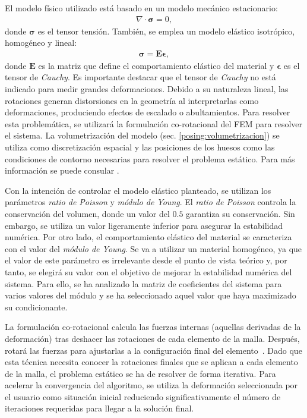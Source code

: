 
El modelo físico utilizado está basado en un modelo mecánico estacionario:
\begin{eqnarray}
\nabla \cdot \mathbf{\sigma} = 0,
\end{eqnarray}
donde $\mathbf{\sigma}$ es el tensor tensión. También, se emplea un modelo elástico isotrópico, homogéneo y lineal:  
\begin{eqnarray}
\mathbf{\sigma} = \mathbf{E}\mathbf{\epsilon}, 
\end{eqnarray}
donde $\mathbf{E}$ es la matriz que define el comportamiento elástico del material y $\mathbf{\epsilon}$ es el tensor de \emph{Cauchy}. Es importante destacar que el tensor de \emph{Cauchy} no está indicado para medir grandes deformaciones.  Debido a su naturaleza lineal, las rotaciones generan distorsiones en la geometría al interpretarlas como deformaciones, produciendo efectos de escalado o abultamientos. Para resolver esta problemática, se utilizará la formulación co-rotacional del \ac{FEM} para resolver el sistema. La volumetrización del modelo (sec. \ref{posing:volumetrizacion}) se utiliza como discretización espacial y las posiciones de los huesos como las condiciones de contorno necesarias para resolver el problema estático. Para más información se puede consular \cite{Muller2004}.

Con la intención de controlar el modelo elástico planteado, se utilizan los parámetros \emph{ratio de Poisson} y \emph {módulo de Young}. El \emph{ratio de Poisson} controla la conservación del volumen, donde un valor del $0.5$ garantiza su conservación. Sin embargo,  se utiliza un valor ligeramente inferior para asegurar la estabilidad numérica. 
Por otro lado, el comportamiento elástico del material se caracteriza con el valor del \emph {módulo de Young}. Se va a utilizar un material homogéneo, ya que el valor de este parámetro es irrelevante desde el punto de vista teórico y, por tanto, se elegirá su valor con el objetivo de mejorar la estabilidad numérica del sistema. 
Para ello, se ha analizado la matriz de coeficientes del sistema para varios valores del módulo y se ha seleccionado aquel valor que haya maximizado su condicionante.

La formulación co-rotacional calcula las fuerzas internas (aquellas derivadas de la deformación) tras deshacer las rotaciones de cada elemento de la malla. Después, rotará las fuerzas para ajustarlas a la configuración final del elemento~\cite{Muller2004}. Dado que esta técnica necesita conocer la rotaciones finales que se aplican a cada elemento de la malla, el problema estático se ha de resolver de forma iterativa. Para acelerar la convergencia del algoritmo, se utiliza la deformación seleccionada por el usuario como situación inicial reduciendo  significativamente el número de iteraciones requeridas para llegar a la solución final.  %


